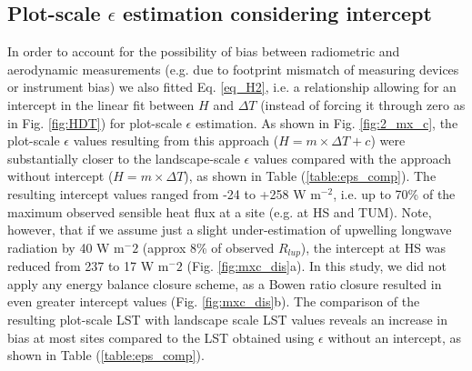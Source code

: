 \documentclass[fleqn,10pt]{wlscirep}
\begin{document}
\subsection{Plot-scale $\epsilon$ estimation considering intercept}
In order to account for the possibility of bias between radiometric and aerodynamic measurements (e.g. due to footprint mismatch of measuring devices or instrument bias) we also fitted Eq. \ref{eq_H2}, i.e. a relationship allowing for an intercept in the linear fit between $H$ and $\Delta T$ (instead of forcing it through zero as in Fig. \ref{fig:HDT}) for plot-scale $\epsilon$ estimation. As shown in Fig. \ref{fig:2_mx_c}, the plot-scale $\epsilon$ values resulting from this approach ($H=m\times\Delta T + c$) were substantially closer to the landscape-scale $\epsilon$ values compared with the approach without intercept ($H=m\times\Delta T$), as shown in Table (\ref{table:eps_comp}). 
The resulting intercept values ranged from -24 to +258 W m$^{-2}$, i.e. up to 70\% of the maximum observed sensible heat flux at a site (e.g. at HS and TUM).  %
 Note, however, that if we assume just a slight under-estimation of upwelling longwave radiation by  40 W m$^-{2}$ (approx 8\% of observed $R_{lup}$), the intercept at HS was reduced from 237 to 17  W m$^-{2}$ (Fig. \ref{fig:mxc_dis}a). In this study, we did not apply any energy balance closure scheme, as a Bowen ratio closure resulted in even greater intercept values (Fig. \ref{fig:mxc_dis}b). %
 The comparison of the resulting plot-scale LST with landscape scale LST values reveals an increase in bias at most sites compared to the LST obtained using $\epsilon$ without an intercept, as shown in Table (\ref{table:eps_comp}). 
\end{document}

